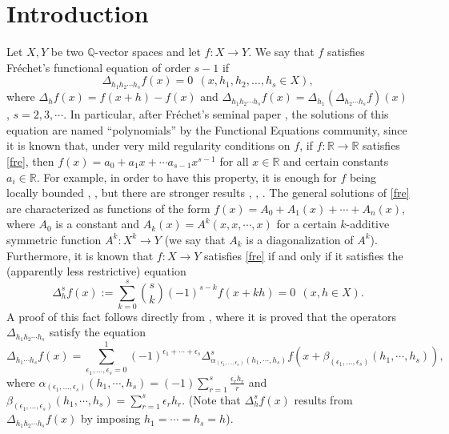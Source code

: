 \documentclass[12pt,a4paper]{amsart}
\theoremstyle{definition}
\begin{document}
\section{Introduction}
Let $X, Y$ be two $\mathbb{Q}$-vector spaces and let $f:X\to Y$. We say that $f$ satisfies Fr\'{e}chet's functional equation of order $s-1$ if \begin{equation}\label{fre}
\Delta_{h_1h_2\cdots h_s}f(x)=0 \ \ (x,h_1,h_2,\dots,h_s\in X),
\end{equation}
where $\Delta_hf(x)=f(x+h)-f(x)$ and $\Delta_{h_1h_2\cdots h_s}f(x)=\Delta_{h_1}\left(\Delta_{h_2\cdots h_s}f\right)(x)$, $s=2,3,\cdots$. In particular, after Fr\'{e}chet's seminal paper \cite{frechet}, the solutions of this equation are named ``polynomials'' by the Functional Equations community, since it is known that, under very mild regularity conditions on $f$, if $f:\mathbb{R}\to\mathbb{R}$ satisfies \eqref{fre}, then $f(x)=a_0+a_1x+\cdots a_{s-1}x^{s-1}$ for all $x\in\mathbb{R}$ and certain constants $a_i\in\mathbb{R}$. For example, in order to have this property, it is enough for $f$ being locally bounded \cite{frechet}, \cite{almira_antonio}, but there are stronger results \cite{ger1}, \cite{kuczma1}, \cite{mckiernan}. The general solutions of \eqref{fre} are characterized as functions of the form $f(x)=A_0+A_1(x)+\cdots+A_n(x)$, where $A_0$ is a constant and $A_k(x)=A^k(x,x,\cdots,x)$ for a certain $k$-additive symmetric function $A^k:X^k\to Y$ (we say that $A_k$ is a diagonalization of $A^k$). Furthermore, it is known that $f:X\to Y$ satisfies \eqref{fre} if and only if it satisfies the (apparently less restrictive) equation
\begin{equation}\label{frepasofijo}
\Delta_{h}^sf(x):=\sum_{k=0}^s\binom{s}{k}(-1)^{s-k}f(x+kh)=0 \ \ (x,h\in X).
\end{equation}
A proof of this fact follows directly from \cite[Theorem 9.2, p. 66]{czerwik}, where it is proved that the operators $\Delta_{h_1 h_2\cdots h_s}$ satisfy the equation
\begin{equation}\label{igualdad}
\Delta_{h_1\cdots h_s}f(x)=
\sum_{\epsilon_1,\dots,\epsilon_s=0}^1(-1)^{\epsilon_1+\cdots+\epsilon_s}
\Delta_{\alpha_{(\epsilon_1,\dots,\epsilon_s)}(h_1,\cdots,h_s)}^sf(x+\beta_{(\epsilon_1,\dots,\epsilon_s)}(h_1,\cdots,h_s)),
\end{equation}
where $\alpha_{(\epsilon_1,\dots,\epsilon_s)}(h_1,\cdots,h_s)=(-1)\sum_{r=1}^s\frac{\epsilon_rh_r}{r}$ and $\beta_{(\epsilon_1,\dots,\epsilon_s)}(h_1,\cdots,h_s)=\sum_{r=1}^s\epsilon_rh_r$.  (Note that $\Delta_{h}^sf(x)$ results from $\Delta_{h_1h_2\cdots h_s}f(x)$ by imposing $h_1=\cdots=h_s=h$).
\end{document}
